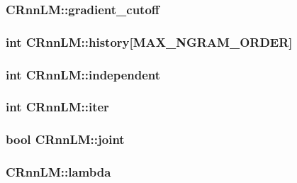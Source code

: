 \subsubsection[{gradient\+\_\+cutoff}]{ C\+Rnn\+L\+M\+::gradient\+\_\+cutoff}\hypertarget{class_c_rnn_l_m_a68278346fc2a19cd1f3039a19b816d01}{}\label{class_c_rnn_l_m_a68278346fc2a19cd1f3039a19b816d01}
\subsubsection[{history}]{\setlength{\rightskip}{0pt plus 5cm}int C\+Rnn\+L\+M\+::history\mbox{[}{\bf M\+A\+X\+\_\+\+N\+G\+R\+A\+M\+\_\+\+O\+R\+D\+ER}\mbox{]}}\hypertarget{class_c_rnn_l_m_a8468aa7a218141a7ef12dad6a7e04e27}{}\label{class_c_rnn_l_m_a8468aa7a218141a7ef12dad6a7e04e27}
\subsubsection[{independent}]{\setlength{\rightskip}{0pt plus 5cm}int C\+Rnn\+L\+M\+::independent}\hypertarget{class_c_rnn_l_m_a56ac0b33cf910ceaf3b110317dc40ed3}{}\label{class_c_rnn_l_m_a56ac0b33cf910ceaf3b110317dc40ed3}
\subsubsection[{iter}]{\setlength{\rightskip}{0pt plus 5cm}int C\+Rnn\+L\+M\+::iter}\hypertarget{class_c_rnn_l_m_aff9e429b5225950afc0ead875877b62c}{}\label{class_c_rnn_l_m_aff9e429b5225950afc0ead875877b62c}
\subsubsection[{joint}]{\setlength{\rightskip}{0pt plus 5cm}bool C\+Rnn\+L\+M\+::joint}\hypertarget{class_c_rnn_l_m_a8daf731b007a23d5625f21f47467b73d}{}\label{class_c_rnn_l_m_a8daf731b007a23d5625f21f47467b73d}
\subsubsection[{lambda}]{ C\+Rnn\+L\+M\+::lambda}\hypertarget{class_c_rnn_l_m_a58ae1c9e2546a3d71783ec8391839acd}{}\label{class_c_rnn_l_m_a58ae1c9e2546a3d71783ec8391839acd}
